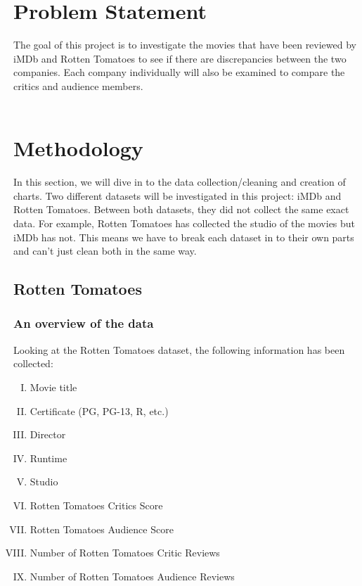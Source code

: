 \documentclass[12pt]{article}
\begin{document}
\section{Problem Statement}
\noindent The goal of this project is to investigate the movies that have been reviewed by iMDb and Rotten Tomatoes to see if there are discrepancies between the two companies. Each company individually will also be examined to compare the critics and audience members.  \\ \\

\section{Methodology}
In this section, we will dive in to the data collection/cleaning and creation of charts. Two different datasets will be investigated in this project: iMDb and Rotten Tomatoes. Between both datasets, they did not collect the same exact data. For example, Rotten Tomatoes has collected the studio of the movies but iMDb has not. This means we have to break each dataset in to their own parts and can't just clean both in the same way. \\
\newpage


\subsection{Rotten Tomatoes}
\subsubsection{An overview of the data}

\noindent Looking at the Rotten Tomatoes dataset, the following information has been collected: \\
\begin{enumerate}[(I)]
    \item Movie title \\
    \item Certificate (PG, PG-13, R, etc.) \\
    \item Director \\
    \item Runtime \\
    \item Studio \\
    \item Rotten Tomatoes Critics Score \\
    \item Rotten Tomatoes Audience Score \\
    \item Number of Rotten Tomatoes Critic Reviews \\
    \item Number of Rotten Tomatoes Audience Reviews \\
\end{enumerate}
\end{document}
